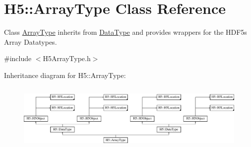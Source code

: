 \hypertarget{class_h5_1_1_array_type}{}\section{H5\+:\+:Array\+Type Class Reference}
\label{class_h5_1_1_array_type}


Class \hyperlink{class_h5_1_1_array_type}{Array\+Type} inherits from \hyperlink{class_h5_1_1_data_type}{Data\+Type} and provides wrappers for the H\+D\+F5\textquotesingle{}s Array Datatypes.  




{\ttfamily \#include $<$H5\+Array\+Type.\+h$>$}

Inheritance diagram for H5\+:\+:Array\+Type\+:\begin{figure}[H]
\begin{center}
\leavevmode
\includegraphics[height=3.301887cm]{class_h5_1_1_array_type}
\end{center}
\end{figure}
